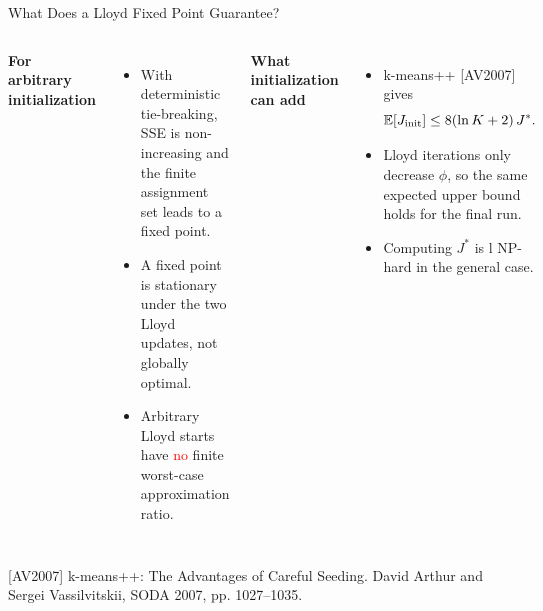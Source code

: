 \begin{frame}{What Does a Lloyd Fixed Point Guarantee?}
  \footnotesize
  \begin{columns}[T,onlytextwidth]
      \textbf{For arbitrary initialization}
      \begin{itemize}\setlength{\itemsep}{.06cm}
        \item With deterministic tie-breaking, SSE is non-increasing and the finite assignment set leads to a fixed point.
        \item A fixed point is stationary under the two Lloyd updates, not globally optimal.
        \item Arbitrary Lloyd starts have \textcolor{red}{no} finite worst-case approximation ratio.
      \end{itemize}
      \textbf{What initialization can add}
      \begin{itemize}\setlength{\itemsep}{.06cm}
        \item k-means++ [AV2007] gives
        \[
          \mathbb E[J_{\mathrm{init}}]\le 8(\ln K+2)\,J^*.
        \]
        \item Lloyd iterations only decrease $\phi$, so the same expected upper bound holds for the final run.
        \item Computing $J^*$ is l NP-hard in the general case.
      \end{itemize}
  \end{columns}
  \vspace{0.5cm}
  \scriptsize [AV2007]  k-means++: The Advantages of Careful Seeding. David Arthur and Sergei Vassilvitskii, SODA 2007, pp. 1027–1035.
\end{frame}


